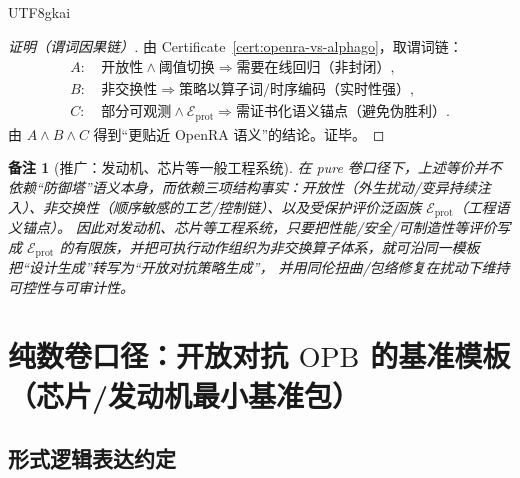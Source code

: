 \documentclass[12pt]{article}
\newtheorem{remark}{备注}[section]
\newcommand{\OPB}{\ensuremath{\mathrm{OPB}}}
\begin{document}
\begin{CJK*}{UTF8}{gkai}
\begin{proof}[证明（谓词因果链）]
由 Certificate~\ref{cert:openra-vs-alphago}，取谓词链：
\[
\begin{aligned}
A:&\ \text{开放性}\wedge \text{阈值切换}\Rightarrow \text{需要在线回归（非封闭）},\\
B:&\ \text{非交换性}\Rightarrow \text{策略以算子词/时序编码（实时性强）},\\
C:&\ \text{部分可观测}\wedge \mathcal{E}_{\mathrm{prot}}\Rightarrow \text{需证书化语义锚点（避免伪胜利）}.
\end{aligned}
\]
由 $A\wedge B\wedge C$ 得到“更贴近 \textsf{OpenRA} 语义”的结论。证毕。
\end{proof}

\begin{remark}[推广：发动机、芯片等一般工程系统]
在 pure 卷口径下，上述等价并不依赖“防御塔”语义本身，而依赖三项结构事实：开放性（外生扰动/变异持续注入）、非交换性（顺序敏感的工艺/控制链）、以及受保护评价泛函族 $\mathcal{E}_{\mathrm{prot}}
  $（工程语义锚点）。
因此对发动机、芯片等工程系统，只要把性能/安全/可制造性等评价写成 $\mathcal{E}_{\mathrm{prot}}$ 的有限族，并把可执行动作组织为非交换算子体系，就可沿同一模板把“设计生成”转写为“开放对抗策略生成”，
  并用同伦扭曲/包络修复在扰动下维持可控性与可审计性。
\end{remark}

\clearpage
\section{纯数卷口径：开放对抗 \OPB{} 的基准模板（芯片/发动机最小基准包）}
\label{sec:puremath-open-adversarial-opb-benchmark-template}

\subsection{形式逻辑表达约定}


\end{CJK*}
\end{document}
